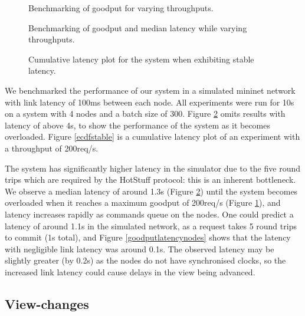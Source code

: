 \begin{figure}[h!]
\centering
\resizebox{.6\textwidth}{!}{}
\caption{Benchmarking of goodput for varying throughputs.}
\label{throughoutgoodputmininet}
\end{figure}

\begin{figure}[h!]
\centering
\resizebox{.5\textwidth}{!}{}
\caption{Benchmarking of goodput and median latency while varying throughputs.}
\label{goodputlatencymininet}
\end{figure}

\begin{figure}[h!]
\centering
\resizebox{.6\textwidth}{!}{}
\caption{Cumulative latency plot for the system when exhibiting stable latency.}
\label{ecdfmininet}
\end{figure}

We benchmarked the performance of our system in a simulated mininet network \cite{mininet,lantzNetworkLaptopRapid2010} with link latency of 100ms between each node. All experiments were run for 10s on a system with 4 nodes and a batch size of 300. Figure \ref{goodputlatencymininet} omits results with latency of above 4s, to show the performance of the system as it becomes overloaded. Figure \ref{ecdfstable} is a cumulative latency plot of an experiment with a throughput of 200req/s.

The system has significantly higher latency in the simulator due to the five round trips which are required by the HotStuff protocol: this is an inherent bottleneck. We observe a median latency of around 1.3s (Figure \ref{goodputlatencymininet}) until the system becomes overloaded when it reaches a maximum goodput of 200req/s (Figure \ref{throughoutgoodputmininet}), and latency increases rapidly as commands queue on the nodes. One could predict a latency of around 1.1s in the simulated network, as a request takes 5 round trips to commit (1s total), and Figure \ref{goodputlatencynodes} shows that the latency with negligible link latency was around 0.1s. The observed latency may be slightly greater (by 0.2s) as the nodes do not have synchronised clocks, so the increased link latency could cause delays in the view being advanced.

\subsection{View-changes} \label{viewchangeeval}

